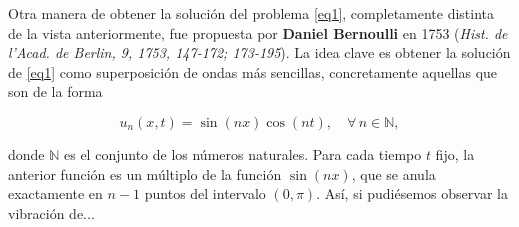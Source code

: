 Otra manera de obtener la solución del problema \ref{eq1}, completamente distinta de la vista anteriormente, fue propuesta por \textbf{Daniel Bernoulli} en 1753 (\textit{Hist. de l'Acad. de Berlin, 9, 1753, 147-172; 173-195}). La idea clave es obtener la solución de \ref{eq1} como superposición de ondas más sencillas, concretamente aquellas que son de la forma

\begin{equation}\label{eq3}
	u_n(x,t) = \sin(nx) \cos(nt), \quad \forall \, n \in \mathbb{N},
\end{equation}

donde $\mathbb{N}$ es el conjunto de los números naturales. Para cada tiempo $t$ fijo, la anterior función es un múltiplo de la función $\sin(nx)$, que se anula exactamente en $n-1$ puntos del intervalo $(0, \pi)$. Así, si pudiésemos observar la vibración de...


